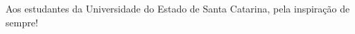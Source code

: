 \begin{dedicatoria}
	\vspace*{\fill}

	{%
		\noindent\hspace{.5\textwidth}
		{\begin{minipage}{.5\textwidth}
				\begin{flushleft}
					Aos estudantes da Universidade do Estado de Santa Catarina, pela inspiração de sempre!
				\end{flushleft}
			\end{minipage}}%
		\vspace*{3cm}
	}%

\end{dedicatoria}
